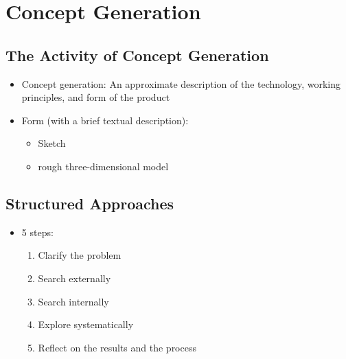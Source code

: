 \documentclass[openany,12pt,a4paper]{book}
\begin{document}
\section{Concept Generation}
\subsection{The Activity of Concept Generation}
\begin{itemize}
    \item Concept generation: An approximate description of the technology, working principles, and form of the product
    \item Form (with a brief textual description):
    \begin{itemize}
        \item Sketch
        \item rough three-dimensional model
    \end{itemize}
\end{itemize}
\subsection{Structured Approaches}
\begin{itemize}
    \item 5 steps:
    \begin{enumerate}
        \item Clarify the problem
        \item Search externally
        \item Search internally
        \item Explore systematically
        \item Reflect on the results and the process
    \end{enumerate}
\end{itemize}
\end{document}
